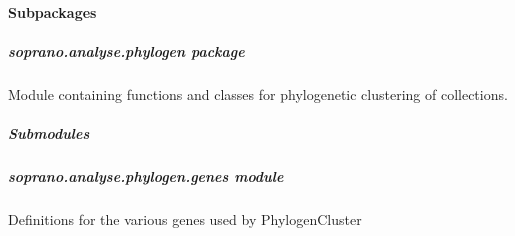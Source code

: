 \documentclass[letterpaper,10pt,english]{sphinxmanual}
\begin{document}
\paragraph{Subpackages}
\label{doctree/soprano.analyse:subpackages}

\subparagraph{soprano.analyse.phylogen package}
\label{doctree/soprano.analyse.phylogen::doc}\label{doctree/soprano.analyse.phylogen:soprano-analyse-phylogen-package}\label{doctree/soprano.analyse.phylogen:module-soprano.analyse.phylogen}
Module containing functions and classes for phylogenetic clustering of
collections.


\subparagraph{Submodules}
\label{doctree/soprano.analyse.phylogen:submodules}

\subparagraph{soprano.analyse.phylogen.genes module}
\label{doctree/soprano.analyse.phylogen.genes:soprano-analyse-phylogen-genes-module}\label{doctree/soprano.analyse.phylogen.genes:module-soprano.analyse.phylogen.genes}\label{doctree/soprano.analyse.phylogen.genes::doc}
Definitions for the various genes used by PhylogenCluster
\end{document}
